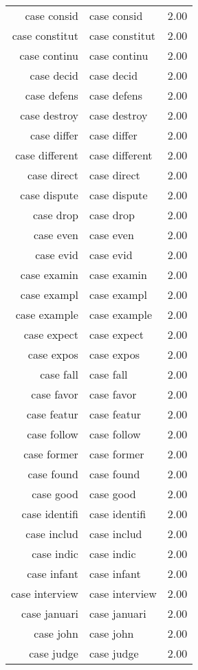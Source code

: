 \begin{table}[ht]
\begin{tabular}{rlr}
  case consid & case consid & 2.00 \\ 
  case constitut & case constitut & 2.00 \\ 
  case continu & case continu & 2.00 \\ 
  case decid & case decid & 2.00 \\ 
  case defens & case defens & 2.00 \\ 
  case destroy & case destroy & 2.00 \\ 
  case differ & case differ & 2.00 \\ 
  case different & case different & 2.00 \\ 
  case direct & case direct & 2.00 \\ 
  case dispute & case dispute & 2.00 \\ 
  case drop & case drop & 2.00 \\ 
  case even & case even & 2.00 \\ 
  case evid & case evid & 2.00 \\ 
  case examin & case examin & 2.00 \\ 
  case exampl & case exampl & 2.00 \\ 
  case example & case example & 2.00 \\ 
  case expect & case expect & 2.00 \\ 
  case expos & case expos & 2.00 \\ 
  case fall & case fall & 2.00 \\ 
  case favor & case favor & 2.00 \\ 
  case featur & case featur & 2.00 \\ 
  case follow & case follow & 2.00 \\ 
  case former & case former & 2.00 \\ 
  case found & case found & 2.00 \\ 
  case good & case good & 2.00 \\ 
  case identifi & case identifi & 2.00 \\ 
  case includ & case includ & 2.00 \\ 
  case indic & case indic & 2.00 \\ 
  case infant & case infant & 2.00 \\ 
  case interview & case interview & 2.00 \\ 
  case januari & case januari & 2.00 \\ 
  case john & case john & 2.00 \\ 
  case judge & case judge & 2.00 \\ 

\end{tabular}
\end{table}
